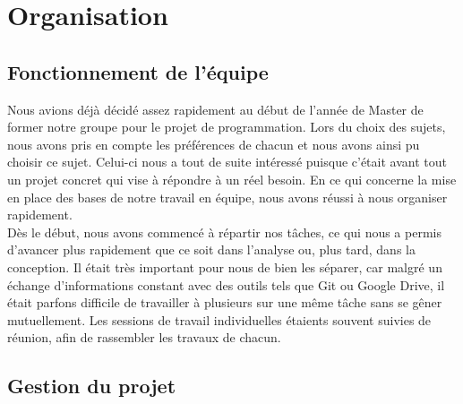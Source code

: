 \documentclass[16pts]{report}
\begin{document}

\nocite{*}

\chapter{Organisation}
\label{cha:Organisation}

\section{Fonctionnement de l'équipe}
\label{sec:Fonctionnement de l'équipe}

Nous avions déjà décidé assez rapidement au début de l'année de Master de former notre groupe pour le projet de programmation. Lors du choix des sujets, nous avons pris en compte les préférences de chacun et nous avons ainsi pu choisir ce sujet. Celui-ci nous a tout de suite intéressé puisque c'était avant tout un projet concret qui vise à répondre à un réel besoin.
En ce qui concerne la mise en place des bases de notre travail en équipe, nous avons réussi à nous organiser rapidement. 
\\
Dès le début, nous avons commencé à répartir nos tâches, ce qui nous a permis d’avancer plus rapidement que ce soit dans l’analyse ou, plus tard, dans la conception. Il était très important pour nous de bien les séparer, car malgré un échange d’informations constant avec des outils tels que Git ou Google Drive, il était parfons difficile de travailler à plusieurs sur une même tâche sans se gêner mutuellement. Les sessions de travail individuelles étaients souvent suivies de réunion, afin de rassembler les travaux de chacun.
\\


\section{Gestion du projet}
\label{sec:Gestion du projet}
\end{document}

